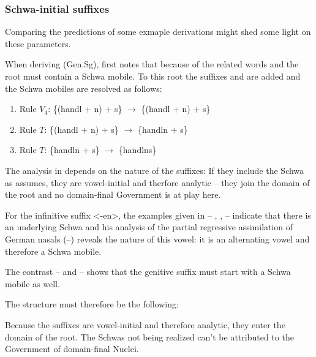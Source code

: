 \subsubsection{Schwa-initial suffixes}
Comparing the predictions of some exmaple derivations might shed
some light on these parameters.

When deriving (Gen.Sg), 
first notes that because of the related words  and 
the root must contain a Schwa mobile. To this root the suffixes
 and  are added and the
Schwa mobiles are resolved as follows:
\begin{enumerate}
  \newcommand\sN{\schwaMobi{}n}
  \newcommand\sS{\schwaMobi{}s}
  \item Rule $V_4$: \{(hand\schwaMobi{}l + \sN) + \sS\} $\to$
    \{(hand\schwaCons{}l + \sN) + \sS\}
  \item Rule $T$: \{(hand\schwaCons{}l + \sN) + \sS\} $\to$
    \{hand\schwaCons{}ln + \sS\}
  \item Rule $T$: \{hand\schwaCons{}ln + \sS\} $\to$ \{hand\schwaCons{}lns\}
\end{enumerate}

The analysis in \CVCV depends on the nature of the suffixes:
If they include the Schwa as \citeauthor{issatschenko1974}
assumes, they are vowel-initial and therfore analytic
-- they join the domain of the root and no domain-final
Government is at play here.

For the infinitive suffix <{}-en>, the examples given
in \textcite[p.~305]{scheer2004} -- , ,
\textellipsis -- indicate that there is an underlying Schwa
and his analysis of the partial regressive assimilation of
German nasals (\ti{[ge:b@n]}--\ti{[ge:b\s{m}]}) reveals the
nature of this vowel: it is an alternating vowel and therefore
a Schwa mobile.

The contrast  --  and
 --  shows that
the genitive suffix must start with a Schwa mobile as well.

The \CVCV structure must therefore be the following:
\begin{structure}{}
  \emptyV
  \V[floating]{\textschwa}
  \V[floating]{\textschwa}
  \V[floating]{\textschwa}
  \fen
\end{structure}
Because the suffixes are vowel-initial and therefore
analytic, they enter the domain of the root.
The Schwas not being realized can't be attributed to
the Government of domain-final Nuclei.

